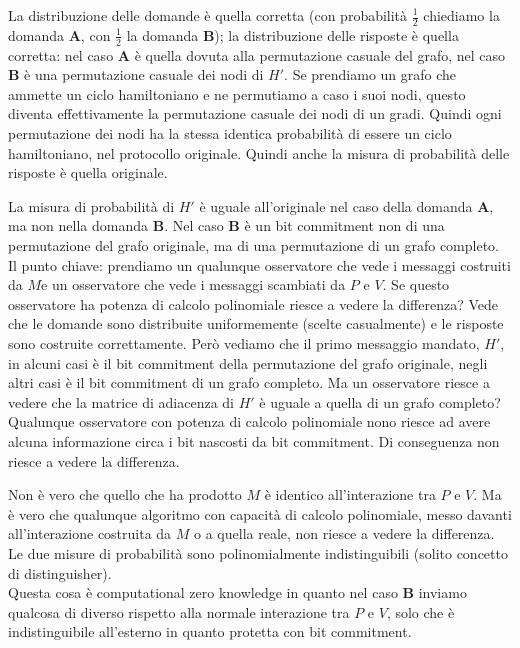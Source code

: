 \noindent La distribuzione delle domande è quella corretta (con probabilità $\frac{1}{2}$ chiediamo la domanda \textbf{A}, con $\frac{1}{2}$ la domanda \textbf{B}); la distribuzione delle risposte è quella corretta: nel caso \textbf{A} è quella dovuta alla permutazione casuale del grafo, nel caso \textbf{B} è una permutazione casuale dei nodi di $H'$.  
Se prendiamo un grafo che ammette un ciclo hamiltoniano e ne permutiamo a caso i suoi nodi, questo diventa effettivamente la permutazione casuale dei nodi di un gradi. Quindi ogni permutazione dei nodi ha la stessa identica probabilità di essere un ciclo hamiltoniano, nel protocollo originale. Quindi anche la misura di probabilità delle risposte è quella originale. 

La misura di probabilità di $H'$ è uguale all'originale nel caso della domanda \textbf{A}, ma non nella domanda \textbf{B}. Nel caso \textbf{B} è un bit commitment non di una permutazione del grafo originale, ma di una permutazione di un grafo completo. Il punto chiave: prendiamo un qualunque osservatore che vede i messaggi costruiti da $M$e un osservatore che vede i messaggi scambiati da $P$ e $V$. Se questo osservatore ha potenza di calcolo polinomiale riesce a vedere la differenza? Vede che le domande sono distribuite uniformemente (scelte casualmente) e le risposte sono costruite correttamente. Però vediamo che il primo messaggio mandato, $H'$, in alcuni casi è il bit commitment della permutazione del grafo originale, negli altri casi è il bit commitment di un grafo completo. Ma un osservatore riesce a vedere che la matrice di adiacenza di $H'$ è uguale a quella di un grafo completo? Qualunque osservatore con potenza di calcolo polinomiale nono riesce ad avere alcuna informazione circa i bit nascosti da bit commitment. Di conseguenza non riesce a vedere la differenza.

Non è vero che quello che ha prodotto $M$ è identico all'interazione tra $P$ e $V$. Ma è vero che qualunque algoritmo con capacità di calcolo polinomiale, messo davanti all'interazione costruita da $M$ o a quella reale, non riesce a vedere la differenza. Le due misure di probabilità sono polinomialmente indistinguibili (solito concetto di distinguisher). 
\\

\noindent Questa cosa è computational zero knowledge in quanto nel caso \textbf{B} inviamo qualcosa di diverso rispetto alla normale interazione tra $P$ e $V$, solo che è indistinguibile all'esterno in quanto protetta con bit commitment.